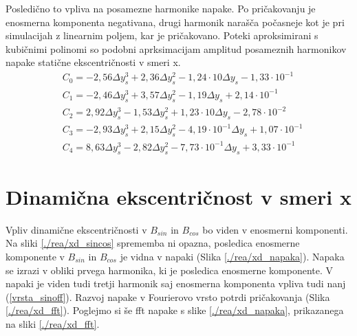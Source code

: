 Posledično to vpliva na posamezne harmonike napake. Po pričakovanju je enosmerna komponenta negativana, drugi harmonik narašča počasneje kot je pri simulacijah z linearnim poljem, kar je pričakovano. Poteki aproksimirani s kubičnimi polinomi so podobni aprksimacijam amplitud posameznih harmonikov napake statične ekscentričnosti v smeri x.
\begin{eqnarray}
&C_0 =-2,56\Delta y_s^{3}+2,36\Delta y_s^{2}-1,24\cdot 10\Delta y_s-1,33\cdot 10^{-1} \\     
&C_1 =-2,46\Delta y_s^{3}+3,57\Delta y_s^{2}-1,19\Delta y_s+2,14\cdot 10^{-1} \\             
&C_2 =2,92\Delta y_s^{3}-1,53\Delta y_s^{2}+1,23\cdot 10\Delta y_s-2,78\cdot 10^{-2} \\      
&C_3 =-2,93\Delta y_s^{3}+2,15\Delta y_s^{2}-4,19\cdot 10^{-1}\Delta y_s+1,07\cdot 10^{-1} \\
&C_4 =8,63\Delta y_s^{3}-2,82\Delta y_s^{2}-7,73\cdot 10^{-1}\Delta y_s+3,33\cdot 10^{-1}          
\end{eqnarray}
\section{Dinamična ekscentričnost v smeri x}
Vpliv dinamične ekscentričnosti v $B_{sin}$ in $B_{cos}$ bo viden v enosmerni komponenti. Na sliki  \ref{./rea/xd_sincos} sprememba ni opazna, posledica enosmerne komponente v $B_{sin}$ in $B_{cos}$  je vidna v napaki (Slika \ref{./rea/xd_napaka}). Napaka se izrazi v obliki prvega harmonika, ki je posledica enosmerne komponente. V napaki je viden tudi tretji harmonik saj enosmerna komponenta vpliva tudi nanj (\ref{vrsta_sinoff}). Razvoj napake v Fourierovo vrsto potrdi pričakovanja (Slika \ref{./rea/xd_fft}). Poglejmo si še fft napake s slike \ref{./rea/xd_napaka}, prikazanega na sliki \ref{./rea/xd_fft}.
\newpage
